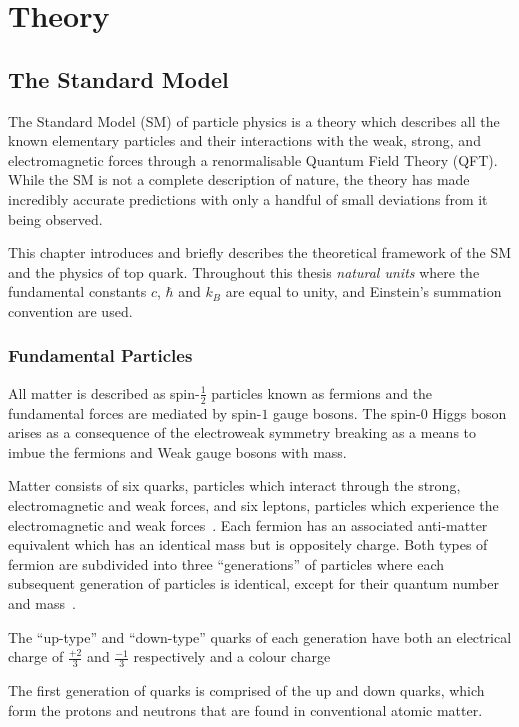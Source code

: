 \chapter{Theory}\label{chapter:theory}
\section{The Standard Model}\label{sec:sm}
The Standard Model (SM) of particle physics is a theory which describes all the known elementary particles and their interactions with the weak, strong, and electromagnetic forces through a renormalisable Quantum Field Theory (QFT).
While the SM is not a complete description of nature, the theory has made incredibly accurate predictions with only a handful of small deviations from it being observed.

This chapter introduces and briefly describes the theoretical framework of the SM and the physics of top quark.
Throughout this thesis \emph{natural units} where the fundamental constants $c$, $\hbar$ and $k_{B}$ are equal to unity, and Einstein's summation convention are used.

\subsection{Fundamental Particles}\label{subsec:particles}

All matter is described as spin-$\frac{1}{2}$ particles known as fermions and the fundamental forces are mediated by spin-$1$ gauge bosons.
The spin-$0$ Higgs boson arises as a consequence of the electroweak symmetry breaking as a means to imbue the fermions and Weak gauge bosons with mass.

Matter consists of six quarks, particles which interact through the strong, electromagnetic and weak forces, and six leptons, particles which experience the electromagnetic and weak forces~\cite{LagrangiansSM}.
Each fermion has an associated anti-matter equivalent which has an identical mass but is oppositely charge.
Both types of fermion are subdivided into three ``generations'' of particles where each subsequent generation of particles is identical, except for their quantum number and mass~\cite{ElectroweakStrong}.


The ``up-type'' and ``down-type'' quarks of each generation have both an electrical charge of $\frac{+2}{3}$ and $\frac{-1}{3}$  respectively and a colour charge


The first generation of quarks is comprised of the up and down quarks, which form the protons and neutrons that are found in conventional atomic matter. 



